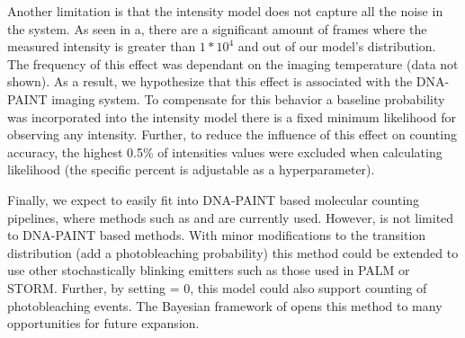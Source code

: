 Another limitation is that the intensity model does not capture all the noise in the system.
    As seen in a, there are a significant amount of frames where the 
    measured intensity is greater than $1*10^4$ and out of our model's distribution.
    The frequency of this effect was dependant on the imaging temperature (data not shown).
    As a result, we hypothesize that this effect is associated with the DNA-PAINT imaging system.
    To compensate for this behavior a baseline probability was incorporated into the intensity model 
    \ie there is a fixed minimum likelihood for observing any intensity.
    Further, to reduce the influence of this effect on counting accuracy, the highest 0.5\% of 
    intensities values were excluded when calculating likelihood (the specific percent is adjustable as a hyperparameter).

Finally, we expect \ours to easily fit into DNA-PAINT based molecular counting pipelines, 
where methods such as \lbfcs and \qpaint are currently used. %
    However, \ours is not limited to DNA-PAINT based methods. 
    With minor modifications to the transition distribution (\ie add a photobleaching probability) 
    this method could be extended to use other stochastically blinking emitters such as those used in PALM or STORM.
    Further, by setting \pon = 0, this model could also support counting of photobleaching events.
    The Bayesian framework of \ours opens this method to many opportunities for future expansion.


